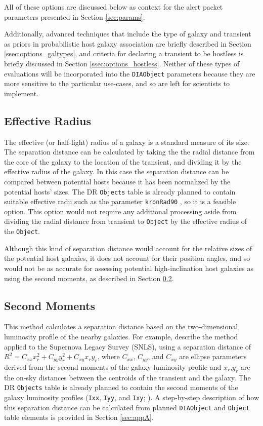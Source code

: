 \documentclass[DM,authoryear,toc]{lsstdoc}
\begin{document}
All of these options are discussed below as context for the alert packet parameters presented in Section \ref{sec:params}. 

Additionally, advanced techniques that include the type of galaxy and transient as priors in probabilistic host galaxy association are briefly described in Section \ref{ssec:options_galtypes}, and criteria for declaring a transient to be hostless is briefly discussed in Section \ref{ssec:options_hostless}.
Neither of these types of evaluations will be incorporated into the {\tt DIAObject} parameters because they are more sensitive to the particular use-cases, and so are left for scientists to implement.


\subsection{Effective Radius}\label{ssec:options_Re}

The effective (or half-light) radius of a galaxy is a standard measure of its size.
The separation distance can be calculated by taking the the radial distance from the core of the galaxy to the location of the transient, and dividing it by the effective radius of the galaxy.
In this case the separation distance can be compared between potential hosts because it has been normalized by the potential hosts' sizes.
The DR {\tt Objects} table is already planned to contain suitable effective radii such as the parameter {\tt kronRad90} , so it is a feasible option.
This option would not require any additional processing aside from dividing the radial distance from transient to {\tt Object} by the effective radius of the {\tt Object}.

Although this kind of separation distance would account for the relative sizes of the potential host galaxies, it does not account for their position angles, and so would not be as accurate for assessing potential high-inclination host galaxies as using the second moments, as described in Section \ref{ssec:options_mom}.


\subsection{Second Moments}\label{ssec:options_mom}

This method calculates a separation distance based on the two-dimensional luminosity profile of the nearby galaxies.
For example, \citet{2006ApJ...648..868S} describe the method applied to the Supernova Legacy Survey (SNLS), using a separation distance of $R^2 = C_{xx} x_r^2 + C_{yy} y_r^2 + C_{xy} x_r y_r$, where $C_{xx}$, $C_{yy}$, and $C_{xy}$ are ellipse parameters derived from the second moments of the galaxy luminosity profile and $x_r$,$y_r$ are the on-sky distances between the centroids of the transient and the galaxy.
The DR {\tt Objects} table is already planned to contain the second moments of the galaxy luminosity profiles ({\tt Ixx}, {\tt Iyy}, and {\tt Ixy}; ).
A step-by-step description of how this separation distance can be calculated from planned {\tt DIAObject} and {\tt Object} table elements is provided in Section \ref{sec:appA}.
\end{document}
